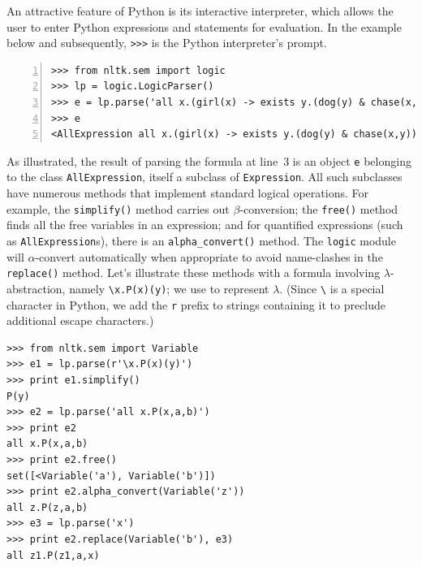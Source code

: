 \documentclass[11pt, a4paper]{article}
\begin{document}
An attractive feature of Python is its interactive interpreter,
which allows the user to enter Python expressions and statements for
evaluation. In the example below and subsequently, \verb!>>>! is the
Python interpreter's prompt. 
\begin{Verbatim}[numbers=left]
>>> from nltk.sem import logic
>>> lp = logic.LogicParser()
>>> e = lp.parse('all x.(girl(x) -> exists y.(dog(y) & chase(x,y)))')
>>> e
<AllExpression all x.(girl(x) -> exists y.(dog(y) & chase(x,y)))>
\end{Verbatim}
As illustrated, the result of parsing the formula at line~3 is an object
\texttt{e} belonging to the class \texttt{AllExpression}, itself a
subclass of \texttt{Expression}.  All such subclasses have numerous
methods that implement standard logical operations. For
example, the \texttt{simplify()} method carries out
$\beta$-conversion; the \texttt{free()} method finds
all the free variables in an expression; and for quantified expressions
(such as \texttt{AllExpression}s), there is an \texttt{alpha\_convert()}
method.  The \texttt{logic}
module will $\alpha$-convert automatically when appropriate to
avoid name-clashes in the \texttt{replace()} method. Let's illustrate
these methods
with a formula involving $\lambda$-abstraction, namely
\verb!\x.P(x)(y)!; we use \protect{\verb!\!} to represent
$\lambda$. (Since \verb!\! is a special character in Python,
we add the \texttt{r} prefix to strings containing it to preclude
additional escape characters.)
\newpage
\begin{Verbatim}
>>> from nltk.sem import Variable
>>> e1 = lp.parse(r'\x.P(x)(y)')
>>> print e1.simplify()
P(y)
>>> e2 = lp.parse('all x.P(x,a,b)')
>>> print e2
all x.P(x,a,b)
>>> print e2.free()
set([<Variable('a'), Variable('b')])
>>> print e2.alpha_convert(Variable('z'))
all z.P(z,a,b)
>>> e3 = lp.parse('x')
>>> print e2.replace(Variable('b'), e3)
all z1.P(z1,a,x)
\end{Verbatim}
\end{document}
